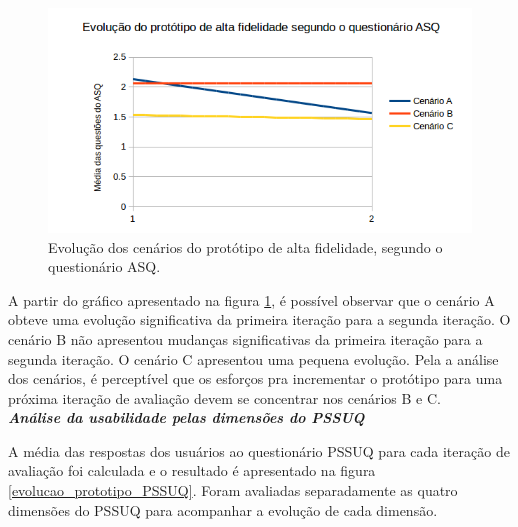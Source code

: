 	\begin{figure}[!htpb]
	  \centering
	  \includegraphics[scale=0.8]{editaveis/figuras/evolucao_prototipo_alta_fidelidade_ASQ}
	  \caption[Evolução dos cenários do protótipo de alta fidelidade, segundo o questionário ASQ]
	    {Evolução dos cenários do protótipo de alta fidelidade, segundo o questionário ASQ.}
	  \label{evolucao_prototipo_alta_fidelidade_ASQ}
	\end{figure}
	
	A partir do gráfico apresentado na figura \ref{evolucao_prototipo_alta_fidelidade_ASQ}, é possível observar que o 
	cenário A obteve uma evolução significativa da primeira iteração para a segunda iteração.
	O cenário B não apresentou mudanças significativas da primeira iteração para a segunda iteração. O cenário C apresentou 
	uma pequena evolução. Pela a análise dos cenários, é perceptível que os esforços pra incrementar o protótipo para uma 
	próxima iteração de avaliação devem se concentrar nos cenários B e C.\\
	
	\noindent
	\emph{\textbf{Análise da usabilidade pelas dimensões do PSSUQ}}
	
	A média das respostas dos usuários ao questionário PSSUQ para cada iteração de avaliação foi calculada e
	o resultado é apresentado na figura \ref{evolucao_prototipo_PSSUQ}.
	Foram avaliadas separadamente as quatro dimensões do PSSUQ para acompanhar a evolução de cada dimensão.
	
